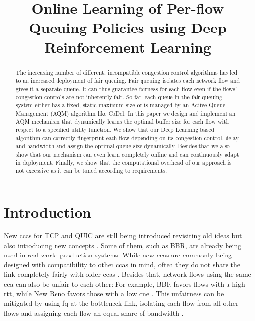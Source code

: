 \documentclass[conference]{IEEEtran}
\begin{document}
\title{Online Learning of Per-flow Queuing Policies using Deep Reinforcement Learning}

\author{
}

\maketitle

\begin{abstract}
The increasing number of different, incompatible congestion control algorithms has led to an increased deployment of fair queuing. Fair queuing isolates each network flow and gives it a separate queue. It can thus guarantee fairness for each flow even if the flows' congestion controls are not inherently fair. So far, each queue in the fair queuing system either has a fixed, static maximum size or is managed by an Active Queue Management (AQM) algorithm like CoDel. In this paper we design and implement an AQM mechanism that dynamically learns the optimal buffer size for each flow with respect to a specified utility function. We show that our Deep Learning based algorithm can correctly fingerprint each flow depending on its congestion control, delay and bandwidth and assign the optimal queue size dynamically. Besides that we also show that our mechanism can even learn completely online and can continuously adapt in deployment. Finally, we show that the computational overhead of our approach is not excessive as it can be tuned according to requirements. 
\end{abstract}

\section{Introduction}
\label{sec:intro}

New \glspl{cca} for TCP and QUIC are still being introduced revisiting old ideas but also introducing new concepts \cite{dong_pcc_2018, cardwell_bbr:_2016, hock_tcp_2017, bachl_cocoa_2019, jay_deep_2019}. Some of them, such as BBR, are already being used in real-world production systems. While new \glspl{cca} are commonly being designed with compatibility to other \glspl{cca} in mind, often they do not share the link completely fairly with older \glspl{cca} \cite{hock_experimental_2017, fejes_who_2019}. Besides that, network flows using the same \gls{cca} can also be unfair to each other: For example, BBR favors flows with a high \gls{rtt}, while New Reno favors those with a low one \cite{turkovic_interactions_2019,turkovic_fifty_2019}. This unfairness can be mitigated by using \gls{fq} at the bottleneck link, isolating each flow from all other flows and assigning each flow an equal share of bandwidth \cite{dumazet_pkt_sched:_2013}. 
\end{document}
